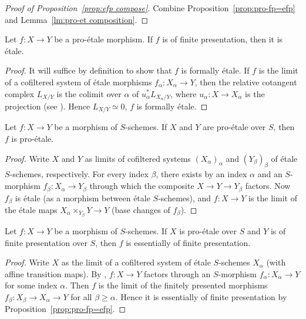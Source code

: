 \begin{proof}[Proof of Proposition~\ref{prop:efp compose}]
Combine Proposition~\ref{prop:pro-fp=efp} and Lemma~\ref{lm:pro-et composition}.
\end{proof}

\begin{lm}\label{lm:pro-et+fp}
Let $f : X \to Y$ be a pro-étale morphism.
If $f$ is of finite presentation, then it is étale.
\end{lm}
\begin{proof}
It will suffice by definition to show that $f$ is formally étale.
If $f$ is the limit of a cofiltered system of étale morphisms $f_\alpha : X_\alpha \to Y$, then the relative cotangent complex $L_{X/Y}$ is the colimit over $\alpha$ of $u_\alpha^*L_{X_\alpha/Y}$, where $u_\alpha : X \to X_\alpha$ is the projection (see \eg \cite[Tags~08S9, 08R2]{Stacks}).
Hence $L_{X/Y} \simeq 0$, \ie $f$ is formally étale.
\end{proof}

\begin{lm}\label{lm:pro-et 2-of-3}
Let $f : X \to Y$ be a morphism of $S$-schemes.
If $X$ and $Y$ are pro-étale over $S$, then $f$ is pro-étale.
\end{lm}
\begin{proof}
Write $X$ and $Y$ as limits of cofiltered systems $(X_\alpha)_\alpha$ and $(Y_\beta)_\beta$ of étale $S$\nobreakdash-schemes, respectively.
For every index $\beta$, there exists by \cite[Prop.\,8.14.2]{EGA4} an index $\alpha$ and an $S$-morphism $f_\beta : X_\alpha \to Y_\beta$ through which the composite $X \to Y \to Y_\beta$ factors.
Now $f_\beta$ is étale (as a morphism between étale $S$-schemes), and $f : X \to Y$ is the limit of the étale maps $X_\alpha \times_{Y_\beta} Y \to Y$ (base changes of $f_\beta$).
\end{proof}

\begin{lm}\label{lm:efp 2-of-3}
Let $f : X \to Y$ be a morphism of $S$-schemes.
If $X$ is pro-étale over $S$ and $Y$ is of finite presentation over $S$, then $f$ is essentially of finite presentation.
\end{lm}
\begin{proof}
Write $X$ as the limit of a cofiltered system of étale $S$-schemes $X_\alpha$ (with affine transition maps).
By \cite[Prop.\,8.14.2]{EGA4}, $f : X \to Y$ factors through an $S$-morphism $f_\alpha : X_\alpha \to Y$ for some index $\alpha$.
Then $f$ is the limit of the finitely presented morphisms $f_\beta : X_\beta \to X_\alpha \to Y$ for all $\beta\geqslant\alpha$.
Hence it is essentially of finite presentation by Proposition~\ref{prop:pro-fp=efp}.
\end{proof}

